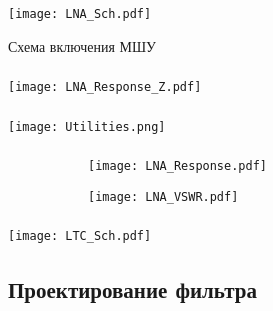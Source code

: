 \documentclass[c]{beamer}  %
\begin{document}
	\begin{frame}
		\frametitle{\insertsection}
		\framesubtitle{\insertsubsection}
		\centering
		\hspace*{-0.075\textwidth}%
		\texttt{[image: LNA\_Sch.pdf]}
		
		\vfill 
		Схема включения МШУ
	\end{frame}


	\begin{frame}
		\frametitle{\insertsection}
		\framesubtitle{\insertsubsection}
		\centering
		\texttt{[image: LNA\_Response\_Z.pdf]}
		
	\end{frame}
	
	\begin{frame}
		\frametitle{\insertsection}
		\framesubtitle{\insertsubsection}
		\centering
		\texttt{[image: Utilities.png]}
		
	\end{frame}

	\begin{frame}
		\frametitle{\insertsection}
		\framesubtitle{\insertsubsection}
		\begin{center}
			\begin{figure}
				\begin{subfigure}{0.45\paperwidth}
					\texttt{[image: LNA\_Response.pdf]}%
				\end{subfigure}%
				\begin{subfigure}{0.45\paperwidth}
					\texttt{[image: LNA\_VSWR.pdf]}
				\end{subfigure}
			\end{figure}
		\end{center}
	\end{frame}
	
	\begin{frame}
		\frametitle{\insertsection}
		\framesubtitle{\insertsubsection}
		\centering
		\texttt{[image: LTC\_Sch.pdf]}
		
	\end{frame}

\subsection{Проектирование фильтра}
\end{document}
